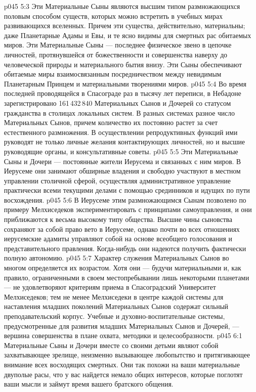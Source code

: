 \vs p045 5:3 Эти Материальные Сыны являются высшим типом размножающихся половым способом существ, которых можно встретить в учебных мирах развивающихся вселенных. Причем эти существа, действительно, материальны; даже Планетарные Адамы и Евы, и те ясно видимы для смертных рас обитаемых миров. Эти Материальные Сыны --- последнее физическое звено в цепочке личностей, протянувшейся от божественности и совершенства наверху до человеческой природы и материального бытия внизу. Эти Сыны обеспечивают обитаемые миры взаимосвязанным посредничеством между невидимым Планетарным Принцем и материальными творениями миров.
\vs p045 5:4 \pc Во время последней проводящейся в Спасограде раз в тысячу лет переписи, в Небадоне зарегистрировано 161\,432\,840 Материальных Сынов и Дочерей со статусом гражданства в столицах локальных систем. В разных системах разное число Материальных Сынов, причем количество их постоянно растет за счет естественного размножения. В осуществлении репродуктивных функций ими руководят не только личные желания контактирующих личностей, но и высшие руководящие органы, и консультативные советы.
\vs p045 5:5 \pc Эти Материальные Сыны и Дочери --- постоянные жители Иерусема и связанных с ним миров. В Иерусеме они занимают обширные владения и свободно участвуют в местном управлении столичной сферой, осуществляя административное управление практически всеми текущими делами с помощью срединников и идущих по пути восхождения.
\vs p045 5:6 В Иерусеме этим размножающимся Сынам позволено по примеру Мелхиседеков экспериментировать с принципами самоуправления, и они приближаются к весьма высокому типу общества. Высшие чины сыновства сохраняют за собой право вето в Иерусеме, однако почти во всех отношениях иерусемские адамиты управляют собой на основе всеобщего голосования и представительного правления. Когда\hyp{}нибудь они надеются получить фактически полную автономию.
\vs p045 5:7 Характер служения Материальных Сынов во многом определяется их возрастом. Хотя они --- будучи материальными и, как правило, ограниченными в своем местопребывании лишь некоторыми планетами --- не удовлетворяют критериям приема в Спасоградский Университет Мелхиседеков; тем не менее Мелхиседеки в центре каждой системы для наставления младших поколений Материальных Сынов содержат сильный преподавательский корпус. Учебные и духовно\hyp{}воспитательные системы, предусмотренные для развития младших Материальных Сынов и Дочерей, --- вершина совершенства в плане охвата, методики и целесообразности.
\vs p045 6:1 Материальные Сыны и Дочери вместе со своими детьми являют собой захватывающее зрелище, неизменно вызывающее любопытство и притягивающее внимание всех восходящих смертных. Они так похожи на ваши материальные двуполые расы, что у вас найдется немало общих интересов, которые поглотят ваши мысли и займут время вашего братского общения.
